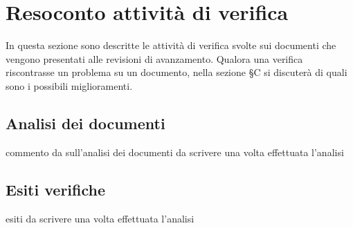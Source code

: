 \section{Resoconto attività di verifica}
In questa sezione sono descritte le attività di verifica svolte sui documenti che vengono presentati alle revisioni di avanzamento. Qualora una verifica riscontrasse un problema su un documento, nella sezione \S C si discuterà di quali sono i possibili miglioramenti.

\subsection{Analisi dei documenti}
commento da sull'analisi dei documenti da scrivere una volta effettuata l'analisi

\subsection{Esiti verifiche}
esiti da scrivere una volta effettuata l'analisi